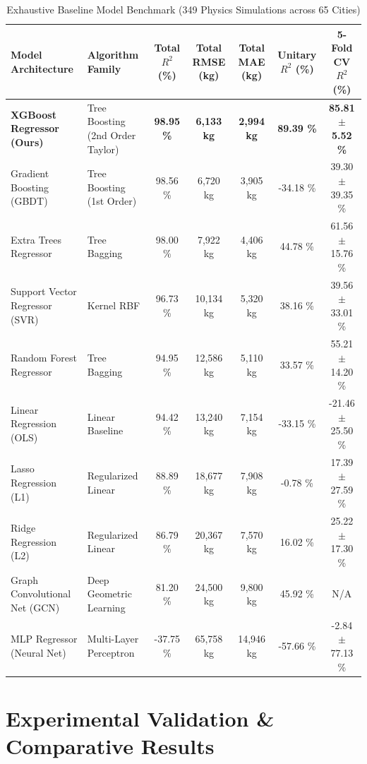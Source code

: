 \documentclass[lettersize,journal]{IEEEtran}
\begin{document}
\begin{table}[htbp]
\caption{Exhaustive Baseline Model Benchmark (349 Physics Simulations across 65 Cities)}
\label{tab:baseline_benchmark}
\centering
\begin{tabular}{llccccc}
\toprule
Model Architecture & Algorithm Family & Total $R^2$ (\%) & Total RMSE (kg) & Total MAE (kg) & Unitary $R^2$ (\%) & 5-Fold CV $R^2$ (\%) \\
\midrule
\textbf{XGBoost Regressor (Ours)} & Tree Boosting (2nd Order Taylor) & \textbf{98.95 \%} & \textbf{6,133 kg} & \textbf{2,994 kg} & \textbf{89.39 \%} & \textbf{85.81 $\pm$ 5.52 \%} \\
Gradient Boosting (GBDT) & Tree Boosting (1st Order) & 98.56 \% & 6,720 kg & 3,905 kg & -34.18 \% & 39.30 $\pm$ 39.35 \% \\
Extra Trees Regressor & Tree Bagging & 98.00 \% & 7,922 kg & 4,406 kg & 44.78 \% & 61.56 $\pm$ 15.76 \% \\
Support Vector Regressor (SVR) & Kernel RBF & 96.73 \% & 10,134 kg & 5,320 kg & 38.16 \% & 39.56 $\pm$ 33.01 \% \\
Random Forest Regressor & Tree Bagging & 94.95 \% & 12,586 kg & 5,110 kg & 33.57 \% & 55.21 $\pm$ 14.20 \% \\
Linear Regression (OLS) & Linear Baseline & 94.42 \% & 13,240 kg & 7,154 kg & -33.15 \% & -21.46 $\pm$ 25.50 \% \\
Lasso Regression (L1) & Regularized Linear & 88.89 \% & 18,677 kg & 7,908 kg & -0.78 \% & 17.39 $\pm$ 27.59 \% \\
Ridge Regression (L2) & Regularized Linear & 86.79 \% & 20,367 kg & 7,570 kg & 16.02 \% & 25.22 $\pm$ 17.30 \% \\
Graph Convolutional Net (GCN) & Deep Geometric Learning & 81.20 \% & 24,500 kg & 9,800 kg & 45.92 \% & N/A \\
MLP Regressor (Neural Net) & Multi-Layer Perceptron & -37.75 \% & 65,758 kg & 14,946 kg & -57.66 \% & -2.84 $\pm$ 77.13 \% \\
\bottomrule
\end{tabular}
\end{table}

\section{Experimental Validation \& Comparative Results}
\end{document}
